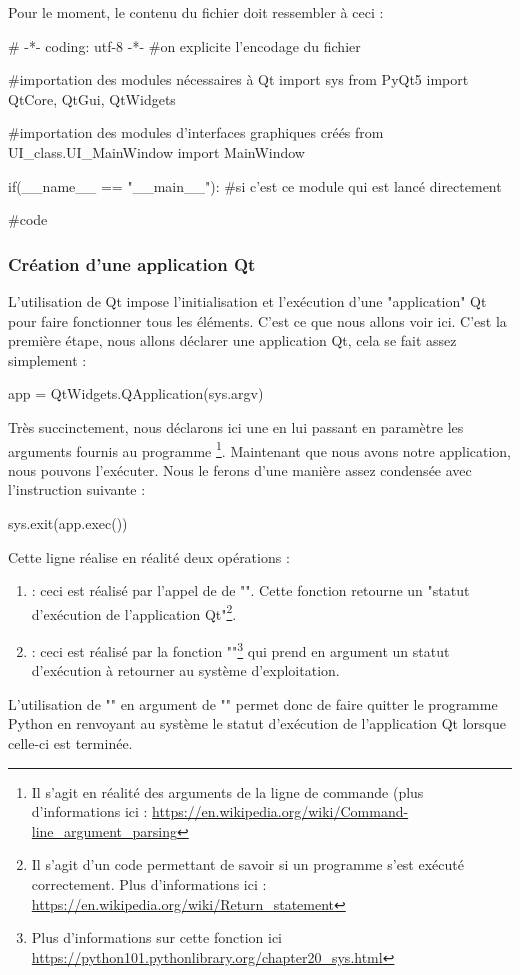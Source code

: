 Pour le moment, le contenu du fichier  doit ressembler à ceci :
\begin{Python}
# -*- coding: utf-8 -*-
#on  explicite l’encodage  du  fichier

#importation des modules nécessaires à Qt
import sys
from PyQt5 import QtCore, QtGui, QtWidgets

#importation des modules d'interfaces graphiques créés
from UI_class.UI_MainWindow import MainWindow


if(__name__ == "__main__"): #si c'est ce module qui est lancé directement

	#code
\end{Python}

\subsubsection{Création d'une application Qt}

L'utilisation de Qt impose l'initialisation et l'exécution d'une "application" Qt pour faire fonctionner tous les éléments. C'est ce que nous allons voir ici.\newline
C'est la première étape, nous allons déclarer une application Qt, cela se fait assez simplement :
\begin{Python}
app = QtWidgets.QApplication(sys.argv)
\end{Python}
Très succinctement, nous déclarons ici une  en lui passant en paramètre les arguments fournis au programme
\footnote{Il s'agit en réalité des arguments de la ligne de commande (plus d'informations ici : \url{https://en.wikipedia.org/wiki/Command-line_argument_parsing}}.\newline
Maintenant que nous avons notre application, nous pouvons l'exécuter. Nous le ferons d'une manière assez condensée avec l'instruction suivante :
\begin{Python}
sys.exit(app.exec())
\end{Python}
Cette ligne réalise en réalité deux opérations :
\begin{enumerate}
    \item {} : ceci est réalisé par l'appel de de "". Cette fonction retourne un "statut d'exécution de l'application Qt"\footnote{Il s'agit d'un code permettant de savoir si un programme s'est exécuté correctement.\newline
    Plus d'informations ici : \url{https://en.wikipedia.org/wiki/Return_statement}}.
    
    \item {} : ceci est réalisé par la fonction ""\footnote{Plus d'informations sur cette fonction ici \url{https://python101.pythonlibrary.org/chapter20_sys.html}} qui prend en argument un statut d'exécution à retourner au système d'exploitation.
\end{enumerate}
L'utilisation de "" en argument de "" permet donc de faire quitter le programme Python en renvoyant au système le statut d'exécution de l'application Qt lorsque celle-ci est terminée.\\

